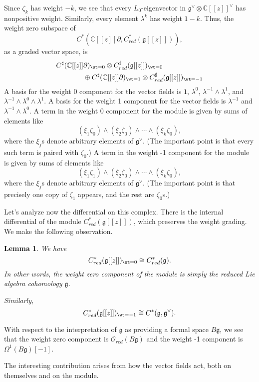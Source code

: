 \documentclass{amsart}
\def\CC{\mathbb C}
\def\fg{\mathfrak g}
\def\ot{\otimes}
\def\sO{\mathscr O}
\newtheorem{lemma}{Lemma}
\begin{document}
Since $\zeta_k$ has weight $-k$, we see that every $L_0$-eigenvector in $\fg^\vee \otimes \CC[[z]]^\vee$ has nonpositive weight. Similarly, every element $\lambda^k$ has weight $1-k$. Thus, the weight zero subspace of
\[
C^*(\CC[[z]]\partial, C^*_{red}(\fg[[z]])),
\] 
as a graded vector space, is
\begin{align*}
C^\sharp(\CC[[z]]&\partial)_{\wt=0} \ot C^\sharp_{red}(\fg[[z]])_{\wt=0} \\
&\oplus C^\sharp(\CC[[z]]\partial)_{\wt=1} \ot C^\sharp_{red}(\fg[[z]])_{\wt=-1}
\end{align*}
A basis for the weight 0 component for the vector fields is $1$, $\lambda^{0}$, $\lambda^{-1} \wedge \lambda^{1}$,  and $\lambda^{-1} \wedge \lambda^0 \wedge \lambda^{1}$. A basis for the weight 1 component for the vector fields is $\lambda^{-1}$ and $\lambda^{-1} \wedge \lambda^0$.  A term in the weight 0 component for the module is given by sums of elements like
\[
(\xi_1 \zeta_0) \wedge (\xi_2 \zeta_0) \wedge \cdots \wedge ( \xi_k \zeta_0),
\]
where the $\xi_j$s denote arbitrary elements of $\fg^\vee$.  (The important point is that every such term is paired with $\zeta_0$.) A term in the weight -1 component for the module is given by sums of elements like
\[
(\xi_1 \zeta_1) \wedge (\xi_2 \zeta_0) \wedge \cdots \wedge ( \xi_k \zeta_0),
\]
where the $\xi_j$s denote arbitrary elements of $\fg^\vee$.  (The important point is that precisely one copy of $\zeta_1$ appears, and the rest are $\zeta_0$s.)

Let's analyze now the differential on this complex. There is the internal differential of the module $C^*_{red}(\fg[[z]])$, which preserves the weight grading. We make the following observation.

\begin{lemma}
We have
\[
C^\ast_{red}(\fg[[z]])_{\wt=0} \cong C^*_{red}(\fg).
\]
In other words, the weight zero component of the module is simply the reduced Lie algebra cohomology $\fg$.

Similarly,
\[
C^\ast_{red}(\fg[[z]])_{\wt=-1} \cong C^*(\fg,\fg^\vee).
\]
\end{lemma}

With respect to the interpretation of $\fg$ as providing a formal space $B\fg$, we see that the weight zero component is $\sO_{red}(B\fg)$ and the weight -1 component is $\Omega^1(B\fg)[-1]$.

The interesting contribution arises from how the vector fields act, both on themselves and on the module. 
\end{document}
